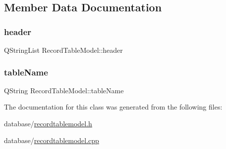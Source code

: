 \subsection{Member Data Documentation}
\mbox{\label{class_record_table_model_aa1e8b825bbdee1a7cb35a236b767cded}} 
\subsubsection{\texorpdfstring{header}{header}}
{\footnotesize\ttfamily Q\+String\+List Record\+Table\+Model\+::header\hspace{0.3cm}{\ttfamily [private]}}

\mbox{\label{class_record_table_model_a845184d414cef77094c51f2ce839ff8e}} 
\subsubsection{\texorpdfstring{tableName}{tableName}}
{\footnotesize\ttfamily Q\+String Record\+Table\+Model\+::table\+Name\hspace{0.3cm}{\ttfamily [private]}}



The documentation for this class was generated from the following files\+:\begin{DoxyCompactItemize}
\item 
database/\mbox{\hyperlink{recordtablemodel_8h}{recordtablemodel.\+h}}\item 
database/\mbox{\hyperlink{recordtablemodel_8cpp}{recordtablemodel.\+cpp}}\end{DoxyCompactItemize}
